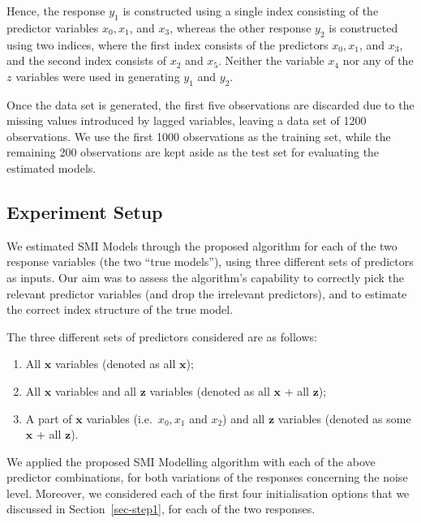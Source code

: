 \documentclass[11pt,a4paper,]{article}
\begin{document}
Hence, the response \(y_{1}\) is constructed using a single index
consisting of the predictor variables \(x_{0}, x_{1}\), and \(x_{3}\),
whereas the other response \(y_{2}\) is constructed using two indices,
where the first index consists of the predictors \(x_{0}, x_{1}\), and
\(x_{3}\), and the second index consists of \(x_{2}\) and \(x_{5}\).
Neither the variable \(x_{4}\) nor any of the \(z\) variables were used
in generating \(y_{1}\) and \(y_{2}\).

Once the data set is generated, the first five observations are
discarded due to the missing values introduced by lagged variables,
leaving a data set of 1200 observations. We use the first 1000
observations as the training set, while the remaining 200 observations
are kept aside as the test set for evaluating the estimated models.

\hypertarget{sec-exp}{%
\subsection{Experiment Setup}\label{sec-exp}}

We estimated SMI Models through the proposed algorithm for each of the
two response variables (the two ``true models''), using three different
sets of predictors as inputs. Our aim was to assess the algorithm's
capability to correctly pick the relevant predictor variables (and drop
the irrelevant predictors), and to estimate the correct index structure
of the true model.

The three different sets of predictors considered are as follows:

\begin{enumerate}
\def\labelenumi{\arabic{enumi}.}
\item
  All \(\bm{x}\) variables (denoted as all \(\bm{x}\));
\item
  All \(\bm{x}\) variables and all \(\bm{z}\) variables (denoted as all
  \(\bm{x}\) + all \(\bm{z}\));
\item
  A part of \(\bm{x}\) variables (i.e.~\(x_{0}, x_{1}\) and \(x_{2}\))
  and all \(\bm{z}\) variables (denoted as some \(\bm{x}\) + all
  \(\bm{z}\)).
\end{enumerate}

We applied the proposed SMI Modelling algorithm with each of the above
predictor combinations, for both variations of the responses concerning
the noise level. Moreover, we considered each of the first four
initialisation options that we discussed in Section~\ref{sec-step1}, for
each of the two responses.
\end{document}
